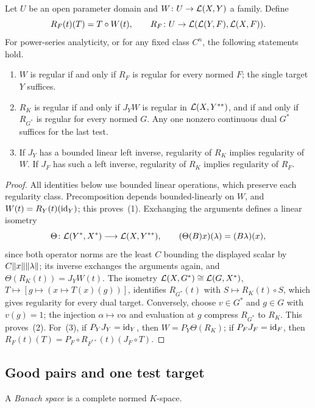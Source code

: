 \begin{theorem}\label{thm:duality}
Let $U$ be an open parameter domain and $W\colon U\to\mathcal L(X,Y)$ a family. Define
\[
 R_F(t)(T)=T\circ W(t),\qquad
 R_F\colon U\to\mathcal L(\mathcal L(Y,F),\mathcal L(X,F)).
\]
For power-series analyticity, or for any fixed class $C^n$, the following statements hold.
\begin{enumerate}
\item $W$ is regular if and only if $R_F$ is regular for every normed $F$; the single target $Y$ suffices.
\item $R_K$ is regular if and only if $J_YW$ is regular in $\mathcal L(X,Y^{**})$, and if and only if
$R_{G^*}$ is regular for every normed $G$. Any one nonzero continuous dual $G^*$ suffices for the last test.
\item If $J_Y$ has a bounded linear left inverse, regularity of $R_K$ implies regularity of $W$.
If $J_F$ has such a left inverse, regularity of $R_K$ implies regularity of $R_F$.
\end{enumerate}
\end{theorem}
\begin{proof}
All identities below use bounded linear operations, which preserve each regularity class. Precomposition depends
bounded-linearly on $W$, and $W(t)=R_Y(t)(\mathrm{id}_Y)$; this proves~(1). Exchanging the arguments defines a linear isometry
\[
 \Theta\colon\mathcal L(Y^*,X^*)\longrightarrow\mathcal L(X,Y^{**}),
 \qquad (\Theta(B)x)(\lambda)=(B\lambda)(x),
\]
since both operator norms are the least $C$ bounding the displayed scalar by $C\lVert x\rVert\lVert \lambda\rVert$; its inverse exchanges
the arguments again, and $\Theta(R_K(t))=J_YW(t)$. The isometry
$\mathcal L(X,G^*)\cong\mathcal L(G,X^*)$, $T\mapsto[g\mapsto(x\mapsto T(x)(g))]$, identifies $R_{G^*}(t)$ with $S\mapsto R_K(t)\circ S$,
which gives regularity for every dual target. Conversely, choose $v\in G^*$ and $g\in G$ with $v(g)=1$; the injection
$\alpha\mapsto v\alpha$ and evaluation at $g$ compress $R_{G^*}$ to $R_K$. This proves~(2). For~(3), if $P_YJ_Y=\mathrm{id}_Y$,
then $W=P_Y\Theta(R_K)$; if $P_FJ_F=\mathrm{id}_F$, then $R_F(t)(T)=P_F\circ R_{F^{**}}(t)(J_F\circ T)$.
\end{proof}

\subsection{Good pairs and one test target}\label{ob:ssec:good}

A \emph{Banach space} is a complete normed $K$-space.

